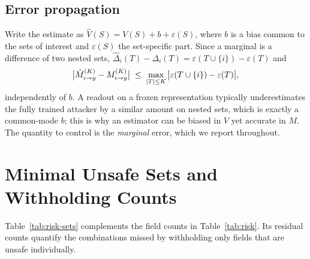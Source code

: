 \subsection{Error propagation}
Write the estimate as $\hat V(S)=V(S)+b+\varepsilon(S)$, where $b$ is a bias common to the sets
of interest and $\varepsilon(S)$ the set-specific part. Since a marginal is a difference of two
nested sets, $\hat\Delta_i(T)-\Delta_i(T)=\varepsilon(T\cup\{i\})-\varepsilon(T)$ and
\begin{equation}\label{eq:prop}
\big|\hat M^{(K)}_{i\to y} - M^{(K)}_{i\to y}\big| \;\le\; \max_{|T|\le K}\big|\varepsilon(T\cup\{i\})-\varepsilon(T)\big|,
\end{equation}
independently of $b$. A readout on a frozen representation typically underestimates the fully
trained attacker by a similar amount on nested sets, which is exactly a common-mode $b$; this is
why an estimator can be biased in $V$ yet accurate in $M$. The quantity to control is the
\emph{marginal} error, which we report throughout.


\FloatBarrier
\section{Minimal Unsafe Sets and Withholding Counts}\label{app:unsafe-sets}
Table~\ref{tab:risk-sets} complements the field counts in Table~\ref{tab:risk}. Its residual counts quantify the combinations missed by withholding only fields that are unsafe individually.

